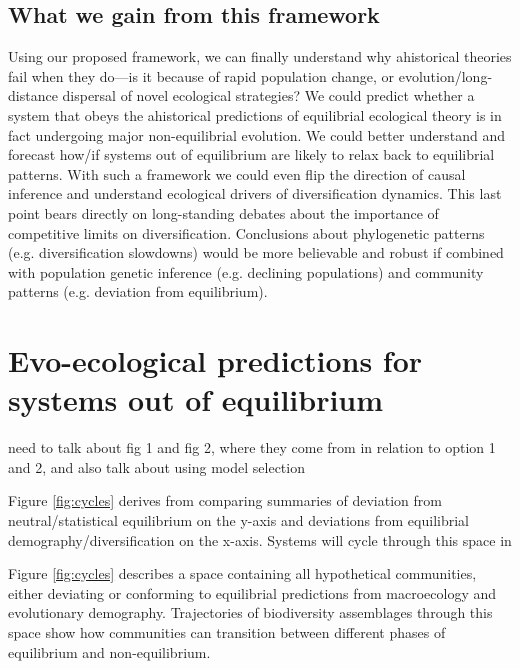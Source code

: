 \documentclass[12pt]{article}
\begin{document}
\subsection{What we gain from this framework}

Using our proposed framework, we can finally understand why
ahistorical theories fail when they do---is it because of rapid
population change, or evolution/long-distance dispersal of novel
ecological strategies? We could predict whether a system that obeys
the ahistorical predictions of equilibrial ecological theory is in
fact undergoing major non-equilibrial evolution. We could better
understand and forecast how/if systems out of equilibrium are likely
to relax back to equilibrial patterns. With such a framework we could
even flip the direction of causal inference and understand ecological
drivers of diversification dynamics. This last point bears directly on
long-standing debates about the importance of competitive limits on
diversification\citep{rabosky2009, harmon2015amNat}. Conclusions about
phylogenetic patterns (e.g. diversification slowdowns) would be more
believable and robust if combined with population genetic inference
(e.g. declining populations) and community patterns (e.g.  deviation
from equilibrium).

\section{Evo-ecological predictions for systems out of equilibrium} \label{sec:pred}

need to talk about fig 1 and fig 2, where they come from in relation
to option 1 and 2, and also talk about using model selection

Figure \ref{fig:cycles} derives from comparing summaries of deviation
from neutral/statistical equilibrium on the y-axis and deviations from
equilibrial demography/diversification on the x-axis. Systems will
cycle through this space in 

Figure \ref{fig:cycles} describes a space containing all hypothetical
communities, either deviating or conforming to equilibrial predictions
from macroecology and evolutionary demography. Trajectories of
biodiversity assemblages through this space show how communities can
transition between different phases of equilibrium and
non-equilibrium. 
%
%
\end{document}
